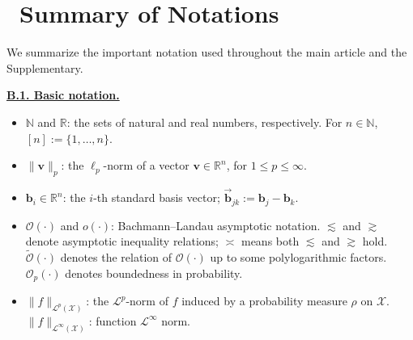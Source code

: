 \documentclass[
  12pt]{article}
\begin{document}
\section{~Summary of Notations}

We summarize the important notation used throughout the main article and the Supplementary.

\underline{\textbf{B.1. Basic notation.}}
\begin{itemize}
    \item $\mathbb{N}$ and $\mathbb{R}$: the sets of natural and real numbers, respectively. For $n \in \mathbb{N}$, $[n]:=\{1, \ldots, n\}$.
    \item $\|\boldsymbol{v}\|_p$: the $\ell_p$-norm of a vector $\boldsymbol{v} \in \mathbb{R}^n$, for $1 \leq p \leq \infty$.
    \item $\mathbf{b}_i \in \mathbb{R}^n$: the $i$-th standard basis vector; $\vec{\mathbf{b}}_{jk} := \mathbf{b}_j - \mathbf{b}_k$.
    \item $\mathcal{O}(\cdot)$ and $o(\cdot)$: Bachmann--Landau asymptotic notation. $\lesssim$ and $\gtrsim$ denote asymptotic inequality relations; $\asymp$ means both $\lesssim$ and $\gtrsim$ hold. $\widetilde{\mathcal{O}}(\cdot)$ denotes the relation of $\mathcal{O}(\cdot)$ up to some polylogarithmic factors. $\mathcal{O}_p(\cdot)$ denotes boundedness in probability.
    \item $\|f\|_{\mathcal{L}^p(\mathcal{X})}$: the $\mathcal{L}^p$-norm of $f$ induced by a probability measure $\rho$ on $\mathcal{X}$. $\|f\|_{\mathcal{L}^\infty(\mathcal{X})}$: function $\mathcal{L}^\infty$ norm.
\end{itemize}
\end{document}

